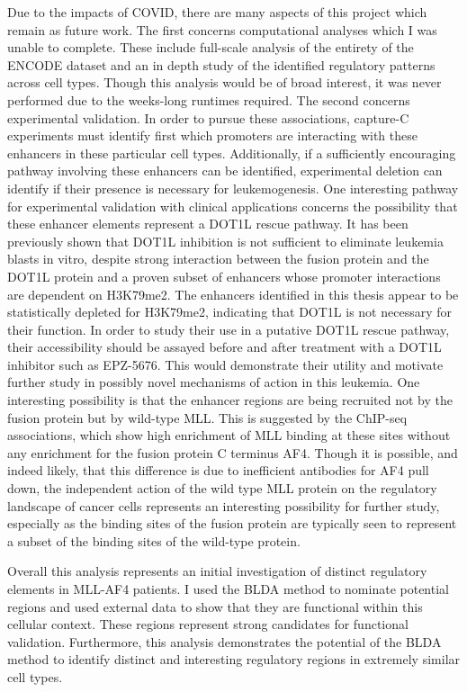 Due to the impacts of COVID, there are many aspects of this project which remain as future work. The first concerns computational analyses which I was unable to complete. These include full-scale analysis of the entirety of the ENCODE dataset and an in depth study of the identified regulatory patterns across cell types. Though this analysis would be of broad interest, it was never performed due to the weeks-long runtimes required. The second concerns experimental validation. In order to pursue these associations, capture-C experiments must identify first which promoters are interacting with these enhancers in these particular cell types. Additionally, if a sufficiently encouraging pathway involving these enhancers can be identified, experimental deletion can identify if their presence is necessary for leukemogenesis. One interesting pathway for experimental validation with clinical applications concerns the possibility that these enhancer elements represent a DOT1L rescue pathway. It has been previously shown that DOT1L inhibition is not sufficient to eliminate leukemia blasts in vitro, despite strong interaction between the fusion protein and the DOT1L protein and a proven subset of enhancers whose promoter interactions are dependent on H3K79me2. The enhancers identified in this thesis appear to be statistically depleted for H3K79me2, indicating that DOT1L is not necessary for their function. In order to study their use in a putative DOT1L rescue pathway, their accessibility should be assayed before and after treatment with a DOT1L inhibitor such as EPZ-5676. This would demonstrate their utility and motivate further study in possibly novel mechanisms of action in this leukemia. One interesting possibility is that the enhancer regions are being recruited not by the fusion protein but by wild-type MLL. This is suggested by the ChIP-seq associations, which show high enrichment of MLL binding at these sites without any enrichment for the fusion protein C terminus AF4. Though it is possible, and indeed likely, that this difference is due to inefficient antibodies for AF4 pull down, the independent action of the wild type MLL protein on the regulatory landscape of cancer cells represents an interesting possibility for further study, especially as the binding sites of the fusion protein are typically seen to represent a subset of the binding sites of the wild-type protein.

Overall this analysis represents an initial investigation of distinct regulatory elements in MLL-AF4 patients. I used the BLDA method to nominate potential regions and used external data to show that they are functional within this cellular context. These regions represent strong candidates for functional validation. Furthermore, this analysis demonstrates the potential of the BLDA method to identify distinct and interesting regulatory regions in extremely similar cell types.

